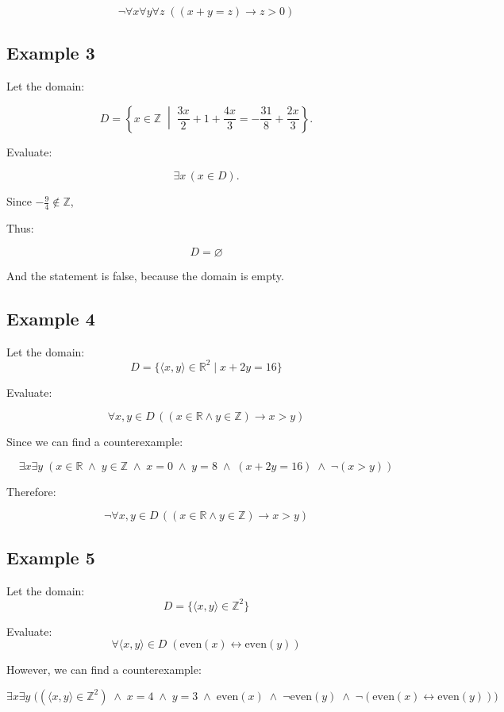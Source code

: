 \documentclass[12pt,a4paper,openany]{article}
\begin{document}
\[\boxed{\neg \forall x \forall y \forall z \;((x + y = z) \to z > 0)}\]

\subsection{Example 3}\label{example-3}

Let the domain:

\[
D = \displaystyle\left\{ x \in \mathbb{Z} \;\middle|\; \frac{3x}{2} + 1 + \frac{4x}{3} = -\frac{31}{8} + \frac{2x}{3} \right\}.
\]

Evaluate:

\[
\exists x \,(x \in D).
\]

Since \(-\tfrac{9}{4} \notin \mathbb{Z}\),

Thus:

\[
\boxed{D = \varnothing}
\]

And the statement is false, because the domain is empty.

\subsection{Example 4}\label{example-4}

Let the domain:
\[D = \{\langle x,y \rangle \in \mathbb{R}^2 \mid x + 2y = 16\} \]

Evaluate:

\[ \forall  x, y \in D \, ((x \in \mathbb{R} \land y \in \mathbb{Z}) \to x > y) \]

Since we can find a counterexample:

\[\exists x \exists y \;(x \in \mathbb{R} \;\land\; y \in \mathbb{Z} \;\land\; x = 0 \;\land\; y = 8 \;\land\; (x + 2y = 16) \;\land\; \neg(x > y))\]

Therefore:

\[\boxed{\neg \forall x, y \in D \, ((x \in \mathbb{R} \land y \in \mathbb{Z}) \to x > y)}\]

\subsection{Example 5}\label{example-5}

Let the domain: \[D = \{\langle x,y \rangle \in \mathbb{Z}^2\}\]

Evaluate:
\[\forall \langle x,y \rangle \in D \;(\text{even}(x) \leftrightarrow \text{even}(y))\]

However, we can find a counterexample:

\[
\exists x \exists y \;\big((\langle x, y \rangle \in \mathbb{Z}^2) \;\land\; x = 4 \;\land\; y = 3 \;\land\; \text{even}(x) \;\land\; \neg\text{even}(y) \;\land\; \neg(\text{even}(x) \leftrightarrow \text{even}(y))\big)
\]
\end{document}
